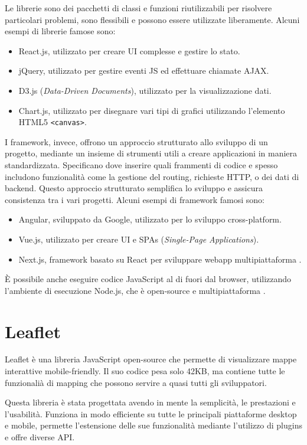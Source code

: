 Le librerie sono dei pacchetti di classi e funzioni riutilizzabili per risolvere particolari problemi, sono flessibili e possono essere utilizzate liberamente. Alcuni esempi di librerie famose sono:
\begin{itemize}
    \item React.js, utilizzato per creare UI complesse e gestire lo stato.
    \item jQuery, utilizzato per gestire eventi JS ed effettuare chiamate AJAX.
    \item D3.js (\textit{Data-Driven Documents}), utilizzato per la visualizzazione dati.
    \item Chart.js, utilizzato per disegnare vari tipi di grafici utilizzando l'elemento HTML5 \Verb_<canvas>_.
\end{itemize}

I framework, invece, offrono un approccio strutturato allo sviluppo di un progetto, mediante un insieme di strumenti utili a creare applicazioni in maniera standardizzata. Specificano dove inserire quali frammenti di codice e spesso includono funzionalità come la gestione del routing, richieste HTTP, o dei dati di backend. Questo approccio strutturato semplifica lo sviluppo e assicura consistenza tra i vari progetti. Alcuni esempi di framework famosi sono:
\begin{itemize}
    \item Angular, sviluppato da Google, utilizzato per lo sviluppo cross-platform.
    \item Vue.js, utilizzato per creare UI e SPAs (\textit{Single-Page Applications}).
    \item Next.js, framework basato su React per sviluppare webapp multipiattaforma \cite{JS_Frameworks_Libraries}.
\end{itemize}

\`E possibile anche eseguire codice JavaScript al di fuori dal browser, utilizzando l'ambiente di esecuzione Node.js, che è open-source e multipiattaforma \cite{Node.js}.

\section{Leaflet}
Leaflet è una libreria JavaScript open-source che permette di visualizzare mappe interattive mobile-friendly. Il suo codice pesa solo 42KB, ma contiene tutte le funzionalià di mapping che possono servire a quasi tutti gli sviluppatori.

Questa libreria è stata progettata avendo in mente la semplicità, le prestazioni e l'usabilità. Funziona in modo efficiente su tutte le principali piattaforme desktop e mobile, permette l'estensione delle sue funzionalità mediante l'utilizzo di plugins e offre diverse API.

